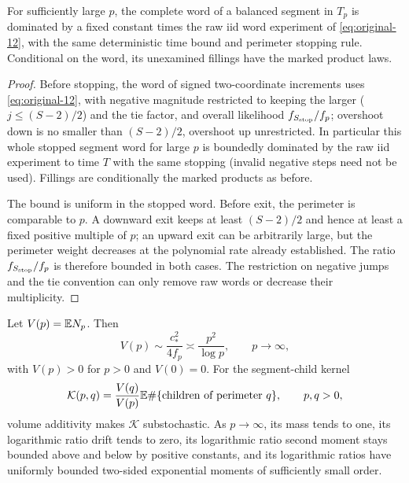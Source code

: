 \begin{lemma}\label{end:segment-law}
For sufficiently large $p$, the complete word of a balanced segment in $T_p$ is dominated by a fixed constant times the raw iid word experiment of \eqref{eq:original-12}, with the same deterministic time bound and perimeter stopping rule. Conditional on the word, its unexamined fillings have the marked product laws.
\end{lemma}

\begin{proof}

Before stopping, the word of signed two-coordinate increments uses \eqref{eq:original-12},
with negative magnitude restricted to keeping the larger (\(j\le(S-2)/2\)) and the tie
factor, and overall likelihood \(f_{S_{\rm stop}}/f_p\); overshoot down is no smaller than
\((S-2)/2\), overshoot up unrestricted. In particular this whole stopped segment word for
large \(p\) is boundedly dominated by the raw iid experiment to time \(T\) with the same
stopping (invalid negative steps need not be used). Fillings are conditionally the marked
products as before.

The bound is uniform in the stopped word. Before exit, the perimeter is
comparable to $p$. A downward exit keeps at least $(S-2)/2$ and hence at least
a fixed positive multiple of $p$; an upward exit can be arbitrarily large, but
the perimeter weight decreases at the polynomial rate already established.
The ratio $f_{S_{\rm stop}}/f_p$ is therefore bounded in both cases. The
restriction on negative jumps and the tie convention can only remove raw words
or decrease their multiplicity.

\end{proof}

\begin{lemma}\label{end:volume-spine}
Let $V(p)=\mathbb E N_p$. Then
\[
 V(p)\sim\frac{c_*^2}{4f_p}\asymp\frac{p^2}{\log p},\qquad p\longrightarrow\infty,
\]
with $V(p)>0$ for $p>0$ and $V(0)=0$. For the segment-child kernel
\[
 \mathcal K(p,q)=\frac{V(q)}{V(p)}
 \mathbb E\#\{\text{children of perimeter }q\},\qquad p,q>0,
\]
volume additivity makes $\mathcal K$ substochastic. As $p\to\infty$, its mass tends
to one, its logarithmic ratio drift tends to zero, its logarithmic ratio second
moment stays bounded above and below by positive constants, and its logarithmic
ratios have uniformly bounded two-sided exponential moments of sufficiently
small order.
\end{lemma}

